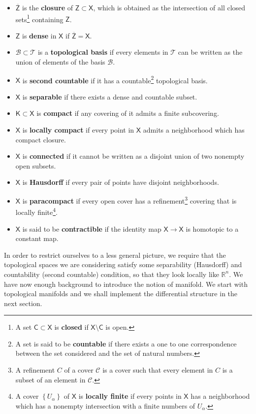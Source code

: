 \documentclass[11pt]{book}
\newcommand{\Bcal}{\mathcal{B}}
\newcommand{\Ccal}{\mathcal{C}}
\newcommand{\Tcal}{\mathcal{T}}
\newcommand{\Rbb}{\mathbb{R}}
\newcommand{\Csf}{\mathsf{C}}
\newcommand{\Ksf}{\mathsf{K}}
\newcommand{\Xsf}{\mathsf{X}}
\newcommand{\Zsf}{\mathsf{Z}}
\theoremstyle{break}
\begin{document}
\begin{itemize}
%
\item $\overline{\Zsf}$ is the \textbf{closure} of $\Zsf \subset \Xsf$, which is obtained as the intersection of all closed sets\footnote{A set $\Csf \subset \Xsf$ is \textbf{closed} if $\Xsf \setminus \Csf$ is open.} containing $\Zsf$.%
%
\item $\Zsf$ is \textbf{dense} in $\Xsf$ if $\overline{\Zsf} = \Xsf$.%
%
\item $\Bcal \subset \Tcal$ is a \textbf{topological basis} if every elements in $\Tcal$ can be written as the union of elements of the basis $\Bcal$.%
%
\item $\Xsf$ is \textbf{second countable} if it has a countable\footnote{A set is said to be \textbf{countable} if there exists a one to one correspondence between the set considered and the set of natural numbers.} topological basis.%
%
\item $\Xsf$ is \textbf{separable} if there exists a dense and countable subset.%
%
\item $\Ksf \subset \Xsf$ is \textbf{compact} if any covering of it admits a finite subcovering.%
%
\item $\Xsf$ is \textbf{locally compact} if every point in $\Xsf$ admits a neighborhood which has compact closure.%
%
\item $\Xsf$ is \textbf{connected} if it cannot be written as a disjoint union of two nonempty open subsets.%
%
\item $\Xsf$ is \textbf{Hausdorff} if every pair of points have disjoint neighborhoods.%
%
\item $\Xsf$ is \textbf{paracompact} if every open cover has a refinement\footnote{A refinement $C$ of a cover $\Ccal$ is a cover such that every element in $C$ is a subset of an element in $\Ccal$.} covering that is locally finite\footnote{A cover $\left\{U_\alpha\right\}$ of $\Xsf$ is \textbf{locally finite} if every points in $\Xsf$ has a neighborhood which has a nonempty intersection with a finite numbers of $U_\alpha$.}.%
%
\item $\Xsf$ is said to be \textbf{contractible} if the identity map $\Xsf \to \Xsf$ is homotopic to a constant map.
\end{itemize}


In order to restrict ourselves to a less general picture, we require that the topological spaces we are considering satisfy some separability (Hausdorff) and countability (second countable) condition, so that they look locally like $\Rbb^n$. We have now enough background to introduce the notion of manifold. We start with topological manifolds and we shall implement the differential structure in the next section.%
\end{document}
